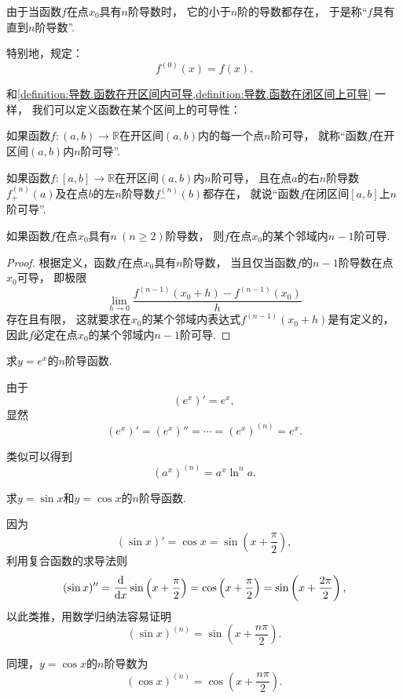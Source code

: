 由于当函数\(f\)在点\(x_0\)具有\(n\)阶导数时，
它的小于\(n\)阶的导数都存在，
于是称“\(f\)具有直到\(n\)阶导数”.

特别地，规定：\begin{equation}
	f^{(0)}(x) = f(x).
\end{equation}

和\cref{definition:导数.函数在开区间内可导,definition:导数.函数在闭区间上可导} 一样，
我们可以定义函数在某个区间上的可导性：
\begin{definition}
如果函数\(f\colon(a,b)\to\mathbb{R}\)在开区间\((a,b)\)内的每一个点\(n\)阶可导，
就称“函数\(f\)在开区间\((a,b)\)内\(n\)阶可导”.
\end{definition}
\begin{definition}
如果函数\(f\colon[a,b]\to\mathbb{R}\)在开区间\((a,b)\)内\(n\)阶可导，
且在点\(a\)的右\(n\)阶导数\(f^{(n)}_+(a)\)及在点\(b\)的左\(n\)阶导数\(f^{(n)}_-(b)\)都存在，
就说“函数\(f\)在闭区间\([a,b]\)上\(n\)阶可导”.
\end{definition}

\begin{proposition}\label{theorem:高阶导数.在一点高阶可导是在该点某邻域内低阶可导的充分条件}
如果函数\(f\)在点\(x_0\)具有\(n\ (n\geq2)\)阶导数，
则\(f\)在点\(x_0\)的某个邻域内\(n-1\)阶可导.
\begin{proof}
根据定义，函数\(f\)在点\(x_0\)具有\(n\)阶导数，
当且仅当函数\(f\)的\(n-1\)阶导数在点\(x_0\)可导，
即极限\[
	\lim_{h\to0} \frac{f^{(n-1)}(x_0+h) - f^{(n-1)}(x_0)}{h}
\]存在且有限，
这就要求在\(x_0\)的某个邻域内表达式\(f^{(n-1)}(x_0+h)\)是有定义的，
因此\(f\)必定在点\(x_0\)的某个邻域内\(n-1\)阶可导.
\end{proof}
\end{proposition}

\begin{example}
求\(y = e^x\)的\(n\)阶导函数.
\begin{solution}
由于\[
	(e^x)' = e^x,
\]
显然\[
	(e^x)'
	= (e^x)''
	= \dotsb
	= (e^x)^{(n)}
	= e^x.
\]
\end{solution}
\end{example}
类似可以得到\[
	(a^x)^{(n)}
	= a^x \ln^n a.
\]

\begin{example}
求\(y = \sin x\)和\(y = \cos x\)的\(n\)阶导函数.
\begin{solution}
因为\[
	(\sin x)' = \cos x
	= \sin\left(x + \frac\pi2\right),
\]
利用复合函数的求导法则\[
	(\sin x)'' = \dv{x} \sin\left(x+\frac\pi2\right)
	= \cos\left(x+\frac\pi2\right)
	= \sin\left(x+\frac{2\pi}2\right),
\]
以此类推，用数学归纳法容易证明\[
	(\sin x)^{(n)}
	= \sin\left(x+\frac{n\pi}2\right).
\]
\end{solution}
\end{example}
同理，\(y = \cos x\)的\(n\)阶导数为\[
	(\cos x)^{(n)}
	= \cos\left(x+\frac{n\pi}2\right).
\]


